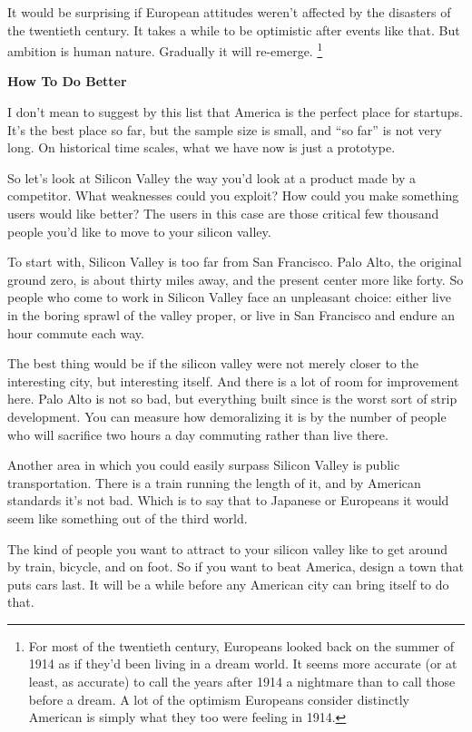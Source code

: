 \documentclass[12pt]{book}
\begin{document}
It would be surprising if European attitudes weren't affected by the
disasters of the twentieth century. It takes a while to be optimistic
after events like that. But ambition is human nature. Gradually it will
re-emerge. \footnote{For most of the twentieth century, Europeans looked back on the
summer of 1914 as if they'd been living in a dream world. It seems more
accurate (or at least, as accurate) to call the years after 1914 a
nightmare than to call those before a dream. A lot of the optimism
Europeans consider distinctly American is simply what they too were
feeling in 1914.}

\textbf{How To Do Better}

I don't mean to suggest by this list that America is the perfect place
for startups. It's the best place so far, but the sample size is small,
and ``so far'' is not very long. On historical time scales, what we have
now is just a prototype.

So let's look at Silicon Valley the way you'd look at a product made by
a competitor. What weaknesses could you exploit? How could you make
something users would like better? The users in this case are those
critical few thousand people you'd like to move to your silicon valley.

To start with, Silicon Valley is too far from San Francisco. Palo Alto,
the original ground zero, is about thirty miles away, and the present
center more like forty. So people who come to work in Silicon Valley
face an unpleasant choice: either live in the boring sprawl of the
valley proper, or live in San Francisco and endure an hour commute each
way.

The best thing would be if the silicon valley were not merely closer to
the interesting city, but interesting itself. And there is a lot of room
for improvement here. Palo Alto is not so bad, but everything built
since is the worst sort of strip development. You can measure how
demoralizing it is by the number of people who will sacrifice two hours
a day commuting rather than live there.

Another area in which you could easily surpass Silicon Valley is public
transportation. There is a train running the length of it, and by
American standards it's not bad. Which is to say that to Japanese or
Europeans it would seem like something out of the third world.

The kind of people you want to attract to your silicon valley like to
get around by train, bicycle, and on foot. So if you want to beat
America, design a town that puts cars last. It will be a while before
any American city can bring itself to do that.
\end{document}
